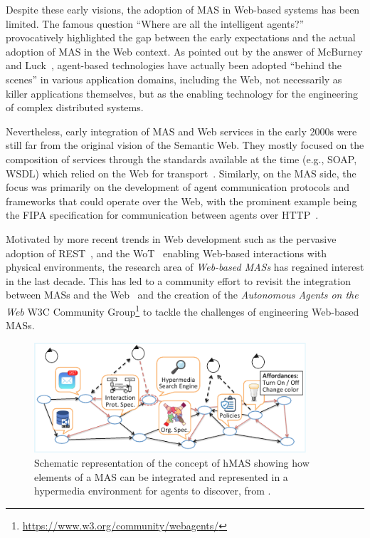 Despite these early visions, the adoption of \ac{MAS} in Web-based systems has been limited.
%
The famous question ``Where are all the intelligent agents?''~\cite{Hendler_2007} provocatively highlighted the gap between the early expectations and the actual adoption of \ac{MAS} in the Web context.
%
As pointed out by the answer of McBurney and Luck~\cite{McBurney_Luck_2007}, agent-based technologies have actually been adopted ``behind the scenes'' in various application domains, including the Web, not necessarily as killer applications themselves, but as the enabling technology for the engineering of complex distributed systems.

Nevertheless, early integration of \ac{MAS} and Web services in the early 2000s were still far from the original vision of the Semantic Web.
%
They mostly focused on the composition of services through the standards available at the time (e.g., SOAP, WSDL) which relied on the Web for transport~\cite{Newcomer_2002}.
%
Similarly, on the \ac{MAS} side, the focus was primarily on the development of agent communication protocols and frameworks that could operate over the Web, with the prominent example being the \ac{FIPA} specification for communication between agents over \ac{HTTP}~\cite{fipa2002http}.

Motivated by more recent trends in Web development such as the pervasive adoption of \ac{REST}~\cite{fielding2000architectural}, and the \ac{WoT}~\cite{Guinard_Trifa_2016_book} enabling Web-based interactions with physical environments, the research area of \emph{Web-based \acp{MAS}} has regained interest in the last decade.
%
This has led to a community effort to revisit the integration between \acp{MAS} and the Web~\cite{Boissier_Ciortea_Harth_Ricci_2021,Boissier_Ciortea_Harth_Ricci_Vachtsevanou_2023} and the creation of the \emph{Autonomous Agents on the Web} \ac{W3C} Community Group\footnote{\url{https://www.w3.org/community/webagents/}} to tackle the challenges of engineering Web-based \acp{MAS}. 

\begin{figure}[t]
    \centering
    \includegraphics[width=0.9\textwidth]{figures/hmas-schema.pdf}
    \caption{Schematic representation of the concept of \acl{hMAS} showing how elements of a \ac{MAS} can be integrated and represented in a hypermedia environment for agents to discover, from \cite{Ciortea_Mayer_Gandon_Boissier_Ricci_Zimmermann_2019}.}
    \label{fig:hmas-overview}
\end{figure}

